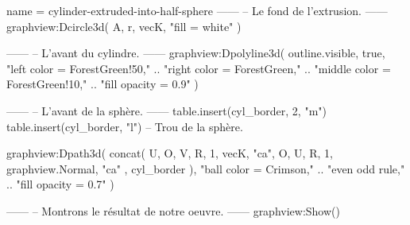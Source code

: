 \documentclass{standalone}
\begin{document}
\begin{luadraw*}{name = cylinder-extruded-into-half-sphere}
------
-- Le fond de l'extrusion.
------
graphview:Dcircle3d(
  A, r, vecK,
  "fill = white"
)

------
-- L'avant du cylindre.
------
graphview:Dpolyline3d(
  outline.visible,
  true,
     "left color = ForestGreen!50,"
  .. "right color = ForestGreen,"
  .. "middle color = ForestGreen!10,"
  .. "fill opacity = 0.9"
)

------
-- L'avant de la sphère.
------
table.insert(cyl_border, 2, "m")
table.insert(cyl_border, "l") -- Trou de la sphère.

graphview:Dpath3d(
  concat(
    {
      U, O, V, R, 1, vecK, "ca",
      O, U, R, 1, graphview.Normal, "ca"
    },
    cyl_border
  ),
     "ball color = Crimson,"
  .. "even odd rule,"
  .. "fill opacity = 0.7"
)

------
-- Montrons le résultat de notre oeuvre.
------
graphview:Show()
\end{luadraw*}
\end{document}
